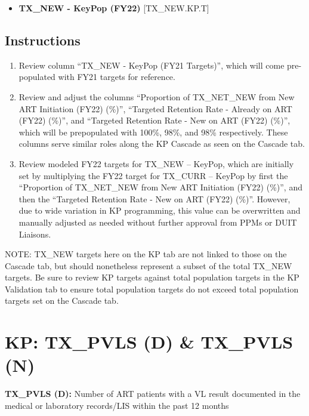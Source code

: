 \documentclass[
  openany]{book}
\providecommand{\tightlist}{%
  \setlength{\itemsep}{0pt}\setlength{\parskip}{0pt}}
\begin{document}
\begin{itemize}
\tightlist
\item
  \textbf{TX\_NEW - KeyPop (FY22)} {[}TX\_NEW.KP.T{]}
\end{itemize}

\hypertarget{instructions-48}{%
\subsection{Instructions}\label{instructions-48}}

\begin{enumerate}
\def\labelenumi{\arabic{enumi}.}
\item
  Review column ``TX\_NEW - KeyPop (FY21 Targets)'', which will come
  pre-populated with FY21 targets for reference.
\item
  Review and adjust the columns ``Proportion of TX\_NET\_NEW from New ART
  Initiation (FY22) (\%)'', ``Targeted Retention Rate - Already on ART
  (FY22) (\%)'', and ``Targeted Retention Rate - New on ART (FY22) (\%)'',
  which will be prepopulated with 100\%, 98\%, and 98\% respectively.
  These columns serve similar roles along the KP Cascade as seen on
  the Cascade tab.
\item
  Review modeled FY22 targets for TX\_NEW -- KeyPop, which are
  initially set by multiplying the FY22 target for TX\_CURR -- KeyPop
  by first the ``Proportion of TX\_NET\_NEW from New ART Initiation
  (FY22) (\%)'', and then the ``Targeted Retention Rate - New on ART
  (FY22) (\%)''. However, due to wide variation in KP programming, this
  value can be overwritten and manually adjusted as needed without
  further approval from PPMs or DUIT Liaisons.
\end{enumerate}

NOTE: TX\_NEW targets here on the KP tab are not linked to those on the
Cascade tab, but should nonetheless represent a subset of the total
TX\_NEW targets. Be sure to review KP targets against total population
targets in the KP Validation tab to ensure total population targets do
not exceed total population targets set on the Cascade tab.\textbf{\hfill\break
}

\hypertarget{kp-tx_pvls-d-tx_pvls-n}{%
\section{KP: TX\_PVLS (D) \& TX\_PVLS (N)}\label{kp-tx_pvls-d-tx_pvls-n}}

\textbf{TX\_PVLS (D):} Number of ART patients with a VL result documented in
the medical or laboratory records/LIS within the past 12 months
\end{document}
